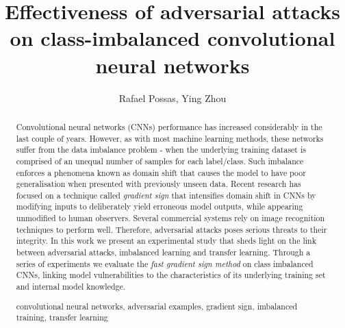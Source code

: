 \documentclass[runningheads,a4paper]{llncs}
\newcommand{\keywords}[1]{\par\addvspace\baselineskip
\noindent\keywordname\enspace\ignorespaces#1}
\begin{document}
\mainmatter  %

\title{Effectiveness of adversarial attacks on class-imbalanced convolutional neural networks}

%
%
\author{Rafael Possas, Ying Zhou}
%


%
%

\maketitle


\begin{abstract}
Convolutional neural networks (CNNs) performance has increased considerably in the last couple of years. However, as with most machine learning methods, these networks suffer from the data imbalance problem - when the underlying training dataset is comprised of an unequal number of samples for each label/class. Such imbalance enforces a phenomena known as domain shift that causes the model to have poor generalisation when presented with previously unseen data. Recent research has focused on a technique called \textit{gradient sign} that intensifies domain shift in CNNs by modifying inputs to deliberately yield erroneous model outputs, while appearing unmodified to human observers. Several commercial systems rely on image recognition techniques to perform well. Therefore, adversarial attacks poses serious threats to their integrity. In this work we present an experimental study that sheds light on the link between adversarial attacks, imbalanced learning and transfer learning. Through a series of experiments we evaluate the \textit{fast gradient sign method} on class imbalanced CNNs, linking model vulnerabilities to the characteristics of its underlying training set and internal model knowledge.
\keywords{convolutional neural networks, adversarial examples, gradient sign, imbalanced training, transfer learning}
\end{abstract}
\end{document}
